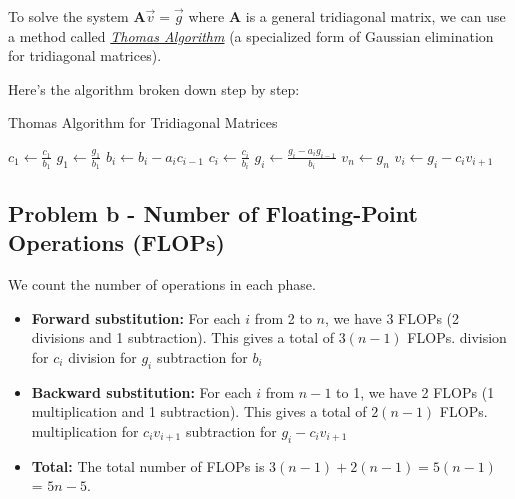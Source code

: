\documentclass[english,notitlepage]{revtex4-1}  %
\begin{document}
To solve the system \( \mathbf{A} \vec{v} = \vec{g} \) where \( \mathbf{A} \) is a general tridiagonal matrix,
we can use a method called \textit{\href{https://en.wikipedia.org/wiki/Tridiagonal_matrix_algorithm}{Thomas Algorithm}}
(a specialized form of Gaussian elimination for tridiagonal matrices).


Here's the algorithm broken down step by step:

\begin{algorithm}[H]
    \caption{Thomas Algorithm for Tridiagonal Matrices}
    \begin{algorithmic}[1]
        \State \( c_1 \gets \frac{c_1}{b_1} \)
        \State \( g_1 \gets \frac{g_1}{b_1} \)
        \State \( b_i \gets b_i - a_i c_{i-1} \) 
        \State \( c_i \gets \frac{c_i}{b_i} \) 
        \EndIf
        \State \( g_i \gets \frac{g_i - a_i g_{i-1}}{b_i} \) 
        \EndFor
        \State \( v_n \gets g_n \) 
        \State \( v_i \gets g_i - c_i v_{i+1} \) 
        \EndFor
    \end{algorithmic}
\end{algorithm}

\subsection*{Problem b - Number of Floating-Point Operations (FLOPs)}

We count the number of operations in each phase.

\begin{itemize}
    \item \textbf{Forward substitution:} For each \( i \) from 2 to \( n \), we have 3 FLOPs (2 divisions and 1 subtraction). This gives a total of \( 3(n-1) \) FLOPs.
           division for \( c_i \)
           division for  \(g_i\)
           subtraction for \(b_i\)
    \item \textbf{Backward substitution:} For each \( i \) from \( n-1 \) to 1, we have 2 FLOPs (1 multiplication and 1 subtraction). This gives a total of \( 2(n-1) \) FLOPs.
           multiplication for \(c_i v_{i+1}\)
           subtraction for \(g_i - c_i v_{i+1}\)
    \item \textbf{Total:} The total number of FLOPs is \( 3(n-1) + 2(n-1) = 5(n-1) \) = \( 5n - 5 \).
\end{itemize}
\end{document}
